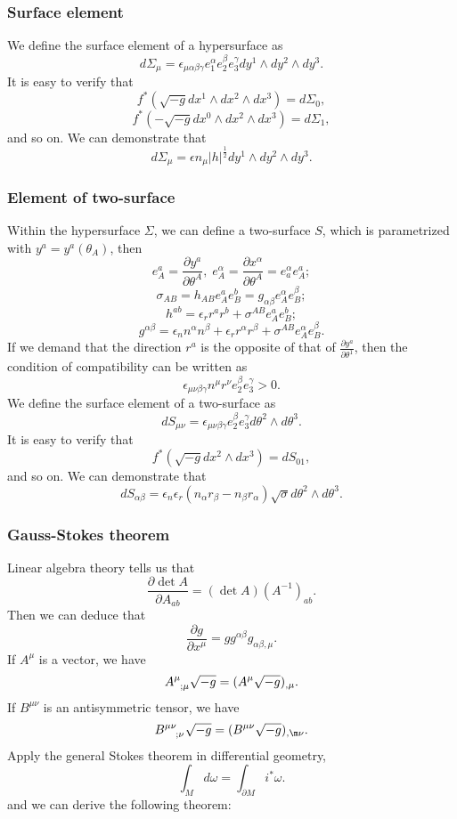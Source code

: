 \subsubsection{Surface element}
\noindent
We define the surface element of a hypersurface as
\[d\Sigma_{\mu} = \epsilon_{\mu \alpha \beta \gamma} e_{1}^{\alpha} e_{2}^{\beta} e_{3}^{\gamma} dy^1 \wedge dy^2 \wedge dy^3.\]
It is easy to verify that
\[f^*(\sqrt{-g} dx^1 \wedge dx^2 \wedge dx^3) = d\Sigma_0,\]
\[f^*(-\sqrt{-g} dx^0 \wedge dx^2 \wedge dx^3) = d\Sigma_1,\]
and so on.
We can demonstrate that
\[d\Sigma_{\mu} = \epsilon n_{\mu} |h|^{\frac{1}{2}} dy^1 \wedge dy^2 \wedge dy^3.\]

\subsubsection{Element of two-surface}
\noindent
Within the hypersurface $\Sigma$, we can define a two-surface $S$, which is parametrized with $y^a = y^a(\theta_A)$, then
\[e_A^a = \frac{\partial y^a}{\partial \theta^A}, \;e_A^{\alpha} = \frac{\partial x^{\alpha}}{\partial \theta^{A}} = e_a^{\alpha} e_A^a ;\]
\[\sigma_{AB} = h_{AB}e_A^a e_B^b = g_{\alpha \beta} e_A^{\alpha} e_B^{\beta};\]
\[h^{ab} = \epsilon_r r^a r^b + \sigma^{AB} e_A^a e_B^b;\]
\[g^{\alpha \beta} = \epsilon_n n^{\alpha} n^{\beta} + \epsilon_r r^{\alpha} r^{\beta} + \sigma^{AB} e_A^{\alpha} e_B^{\beta}.\]
If we demand that the direction $r^a$ is the opposite of that of $\frac{\partial y^a}{\partial \theta^{1}}$, then the condition of compatibility can be written as
\[\epsilon_{\mu \nu \beta \gamma}n^{\mu} r^{\nu} e_2^{\beta} e_3^{\gamma} > 0.\]
We define the surface element of a two-surface as
\[dS_{\mu \nu} = \epsilon_{\mu \nu \beta \gamma} e_2^{\beta} e_3^{\gamma} d\theta^2 \wedge d\theta^3.\]
It is easy to verify that
\[f^*(\sqrt{-g} dx^2 \wedge dx^3) = dS_{01},\]
and so on. We can demonstrate that
\[dS_{\alpha \beta} = \epsilon_n \epsilon_r (n_{\alpha}r_{\beta} - n_{\beta}r_{\alpha}) \sqrt{\sigma} d\theta^2 \wedge d\theta^3.\]

\subsubsection{Gauss-Stokes theorem}
Linear algebra theory tells us that
\[\frac{\partial \det A}{\partial A_{ab}} = (\det A) \left(A^{-1}\right)_{ab}.\]
Then we can deduce that
\[\frac{\partial g}{\partial x^{\mu}} = gg^{\alpha\beta} g_{\alpha\beta,\mu}.\]
If $A^{\mu}$ is a vector, we have
\[ \tensor{A}{^{\mu}_{;\mu}}\sqrt{-g} = (A^{\mu}\sqrt{-g})_{,\mu}.\]
If $B^{\mu\nu}$ is an antisymmetric tensor, we have
\[\tensor{B}{^{\mu\nu}_{;\nu}}\sqrt{-g} = (B^{\mu\nu}\sqrt{-g})_{,\m\nu}.\]
Apply the general Stokes theorem in differential geometry,
\[\int_{M} d\omega = \int_{\partial M} i^* \omega.\]
and we can derive the following theorem:\\

